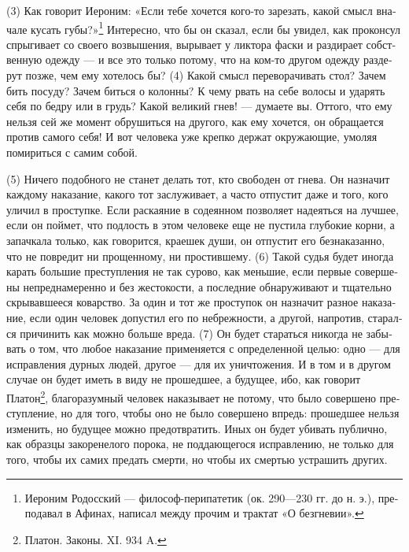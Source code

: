 (3) Как гово­рит Иеро­ним: «Если тебе хочет­ся кого-то заре­зать, какой смысл вна­ча­ле кусать губы?»\footnote{Иеро­ним Родос­ский — фило­соф-пери­па­те­тик (ок. 290—230 гг. до н. э.), пре­по­да­вал в Афи­нах, напи­сал меж­ду про­чим и трак­тат «О без­гне­вии».} Инте­рес­но, что бы он ска­зал, если бы увидел, как про­кон­сул спры­ги­ва­ет со сво­его воз­вы­ше­ния, выры­ва­ет у лик­то­ра фас­ки и разди­ра­ет соб­ст­вен­ную одеж­ду --- и все это толь­ко пото­му, что на ком-то дру­гом одеж­ду разде­рут поз­же, чем ему хоте­лось бы? (4) Какой смысл пере­во­ра­чи­вать стол? Зачем бить посу­ду? Зачем бить­ся о колон­ны? К чему рвать на себе воло­сы и уда­рять себя по бед­ру или в грудь? Какой вели­кий гнев! --- дума­е­те вы. Отто­го, что ему нель­зя сей же момент обру­шить­ся на дру­го­го, как ему хочет­ся, он обра­ща­ет­ся про­тив само­го себя! И вот чело­ве­ка уже креп­ко дер­жат окру­жаю­щие, умо­ляя поми­рить­ся с самим собой.

(5) Ниче­го подоб­но­го не станет делать тот, кто сво­бо­ден от гне­ва. Он назна­чит каж­до­му нака­за­ние, како­го тот заслу­жи­ва­ет, а часто отпу­стит даже и того, кого ули­чил в про­ступ­ке. Если рас­ка­я­ние в соде­ян­ном поз­во­ля­ет наде­ять­ся на луч­шее, если он пой­мет, что под­лость в этом чело­ве­ке еще не пусти­ла глу­бо­кие кор­ни, а запач­ка­ла толь­ко, как гово­рит­ся, кра­е­шек души, он отпу­стит его без­на­ка­зан­но, что не повредит ни про­щен­но­му, ни про­стив­ше­му. (6) Такой судья будет ино­гда карать боль­шие пре­ступ­ле­ния не так суро­во, как мень­шие, если пер­вые совер­ше­ны непред­на­ме­рен­но и без жесто­ко­сти, а послед­ние обна­ру­жи­ва­ют и тща­тель­но скры­вав­ше­е­ся ковар­ство. За один и тот же про­сту­пок он назна­чит раз­ное нака­за­ние, если один чело­век допу­стил его по небреж­но­сти, а дру­гой, напро­тив, ста­рал­ся при­чи­нить как мож­но боль­ше вреда. (7) Он будет ста­рать­ся нико­гда не забы­вать о том, что любое нака­за­ние при­ме­ня­ет­ся с опре­де­лен­ной целью: одно --- для исправ­ле­ния дур­ных людей, дру­гое --- для их уни­что­же­ния. И в том и в дру­гом слу­чае он будет иметь в виду не про­шед­шее, а буду­щее, ибо, как гово­рит Платон\footnote{Пла­тон. Зако­ны. XI. 934 A.}, бла­го­ра­зум­ный чело­век нака­зы­ва­ет не пото­му, что было совер­ше­но пре­ступ­ле­ние, но для того, чтобы оно не было совер­ше­но впредь: про­шед­шее нель­зя изме­нить, но буду­щее мож­но пред­от­вра­тить. Иных он будет уби­вать пуб­лич­но, как образ­цы зако­ре­не­ло­го поро­ка, не под­даю­ще­го­ся исправ­ле­нию, не толь­ко для того, чтобы их самих пре­дать смер­ти, но чтобы их смер­тью устра­шить дру­гих.

